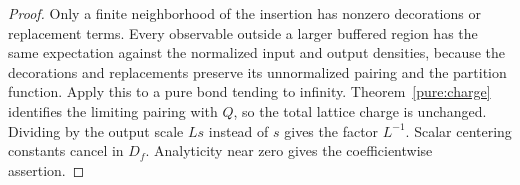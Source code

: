 \begin{proof}
Only a finite neighborhood of the insertion has nonzero decorations or
replacement terms.  Every observable outside a larger buffered region
has the same expectation against the normalized input and output
densities, because the decorations and replacements preserve its
unnormalized pairing and the partition function.  Apply this to a pure
bond tending to infinity.  Theorem~\ref{pure:charge} identifies the
limiting pairing with $Q$, so the total lattice charge is unchanged.
Dividing by the output scale $Ls$ instead of $s$ gives the factor
$L^{-1}$.  Scalar centering constants cancel in $D_f$.  Analyticity near
zero gives the coefficientwise assertion.
\end{proof}
